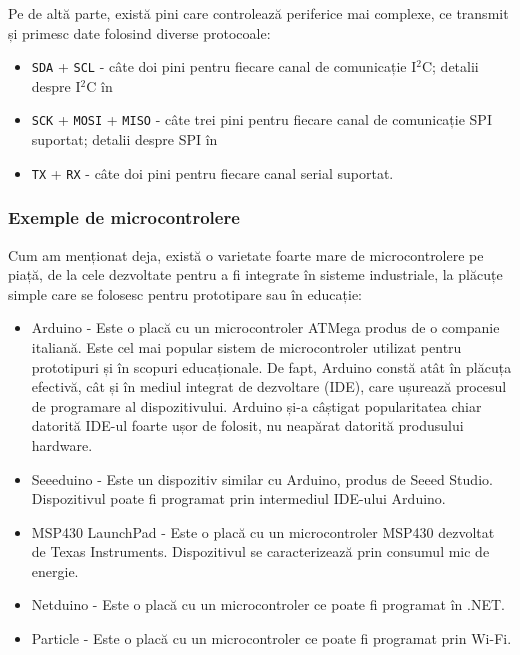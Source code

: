 Pe de altă parte, există pini care controlează periferice mai complexe, ce
transmit și primesc date folosind diverse protocoale:

\begin{itemize}
  \item \texttt{SDA} + \texttt{SCL} - câte doi pini pentru fiecare canal de comunicație I$^2$C; detalii despre I$^2$C în 
  \item \texttt{SCK} + \texttt{MOSI} + \texttt{MISO} - câte trei pini pentru fiecare canal de
          comunicație SPI suportat; detalii despre SPI în 
  \item \texttt{TX} + \texttt{RX} - câte doi pini pentru fiecare canal serial suportat.
\end{itemize}

\subsubsection{Exemple de microcontrolere}
\label{sec:embed:micro-comp:micro:example}

Cum am menționat deja, există o varietate foarte mare de microcontrolere pe
piață, de la cele dezvoltate pentru a fi integrate în sisteme industriale, la
plăcuțe simple care se folosesc pentru prototipare sau în educație:

\begin{itemize}
	\item Arduino - Este o placă cu un microcontroler ATMega produs de o
		companie italiană. Este cel mai popular sistem de microcontroler
		utilizat pentru prototipuri și în scopuri educaționale. De fapt,
		Arduino constă atât în plăcuța efectivă, cât și în mediul
		integrat de dezvoltare (IDE), care ușurează procesul de
		programare al dispozitivului. Arduino și-a câștigat
		popularitatea chiar datorită IDE-ul foarte ușor de folosit, nu
		neapărat datorită produsului hardware.
	\item Seeeduino - Este un dispozitiv similar cu Arduino, produs de Seeed
		Studio. Dispozitivul poate fi programat prin intermediul
		IDE-ului Arduino.
	\item MSP430 LaunchPad - Este o placă cu un microcontroler MSP430
		dezvoltat de Texas Instruments. Dispozitivul se caracterizează
		prin consumul mic de energie.
	\item Netduino - Este o placă cu un microcontroler ce poate fi programat
		în .NET.
	\item Particle - Este o placă cu un microcontroler ce poate fi programat
		prin Wi-Fi.
\end{itemize}

